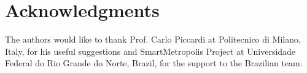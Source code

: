 \documentclass[runningheads]{llncs}
\begin{document}
    
    
    
    
    

%     
%      
%    
    \section*{Acknowledgments}
    \vspace{-10pt}
    The authors would like to thank Prof. Carlo Piccardi at Politecnico di Milano, Italy, for his useful suggestions and SmartMetropolis Project at Universidade Federal do Rio Grande do Norte, Brazil, for the support to the Brazilian team.
	\vspace{-10pt}
	
    
\end{document}

